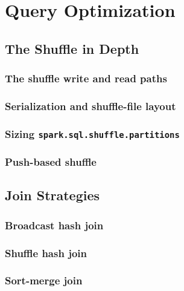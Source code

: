 \chapter{Query Optimization}
\label{ch:queryopt}

\tbd


\section{The Shuffle in Depth}
\label{sec:qo-shuffle}

\subsection{The shuffle write and read paths}
\tbd

\subsection{Serialization and shuffle-file layout}
\tbd

\subsection{Sizing \texttt{spark.sql.shuffle.partitions}}
\tbd

\subsection{Push-based shuffle}
\tbd

\section{Join Strategies}
\label{sec:qo-joins}

\subsection{Broadcast hash join}
\tbd

\subsection{Shuffle hash join}
\tbd

\subsection{Sort-merge join}
\tbd

